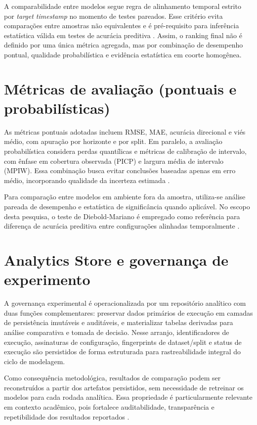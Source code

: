A comparabilidade entre modelos segue regra de alinhamento temporal estrito por \textit{target timestamp} no momento de testes pareados. Esse critério evita comparações entre amostras não equivalentes e é pré-requisito para inferência estatística válida em testes de acurácia preditiva \cite{DIEBOLDMARIANO1995}. Assim, o ranking final não é definido por uma única métrica agregada, mas por combinação de desempenho pontual, qualidade probabilística e evidência estatística em coorte homogênea.

\section{Métricas de avaliação (pontuais e probabilísticas)}
As métricas pontuais adotadas incluem RMSE, MAE, acurácia direcional e viés médio, com apuração por horizonte e por split. Em paralelo, a avaliação probabilística considera perdas quantílicas e métricas de calibração de intervalo, com ênfase em cobertura observada (PICP) e largura média de intervalo (MPIW). Essa combinação busca evitar conclusões baseadas apenas em erro médio, incorporando qualidade da incerteza estimada \cite{GNEITING2007}.

Para comparação entre modelos em ambiente fora da amostra, utiliza-se análise pareada de desempenho e estatística de significância quando aplicável. No escopo desta pesquisa, o teste de Diebold-Mariano é empregado como referência para diferença de acurácia preditiva entre configurações alinhadas temporalmente \cite{DIEBOLDMARIANO1995}.

\section{Analytics Store e governança de experimento}
A governança experimental é operacionalizada por um repositório analítico com duas funções complementares: preservar dados primários de execução em camadas de persistência imutáveis e auditáveis, e materializar tabelas derivadas para análise comparativa e tomada de decisão. Nesse arranjo, identificadores de execução, assinaturas de configuração, fingerprints de dataset/split e status de execução são persistidos de forma estruturada para rastreabilidade integral do ciclo de modelagem.

Como consequência metodológica, resultados de comparação podem ser reconstruídos a partir dos artefatos persistidos, sem necessidade de retreinar os modelos para cada rodada analítica. Essa propriedade é particularmente relevante em contexto acadêmico, pois fortalece auditabilidade, transparência e repetibilidade dos resultados reportados \cite{PINEAU2021REPRODUCIBILITY}.

